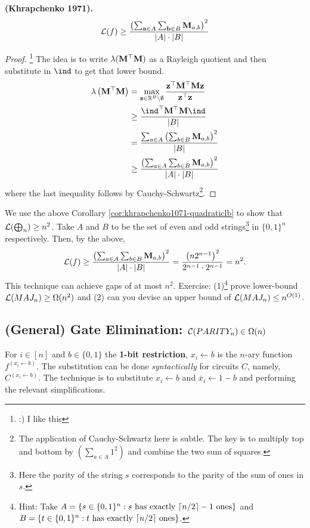 \documentclass[11pt]{article}
\begin{document}
	\begin{corollary}
		\label{cor:khrapchenko1071-quadraticlb}
		\textbf{(Khrapchenko 1971).}
		\[\mathcal{L}(f) \geq \frac{\left(\sum_{\mathbf{a} \in A}\sum_{\mathbf{b} \in B} \mathbf{M}_{a,b}\right)^2}{|A|\cdot|B|}\]
	\end{corollary}
	\begin{proof}
		\footnote{:) I like this} The idea is to write $\lambda(\mathbf{M}^{\top}\mathbf{M})$ as a Rayleigh quotient and then substitute in $\ind$ to get that lower bound.
		\begin{align*}
			\lambda\left(\mm{M}^{\top}\mm{M}\right) &= \max_{\vv{z} \in \RR^{B}\backslash \emptyset} \frac{\vv{z}^{\top}\mm{M}^{\top}\mm{M}\vv{z}}{\vv{z}^{\top}\vv{z}}\\
			&\geq \frac{\ind^{\top}\mm{M}^{\top}\mm{M}\ind}{|B|}\\
			&=\frac{\sum_{a \in A}\left(\sum_{b \in B}\mm{M}_{a,b}\right)^2}{|B|}\\
			&\geq \frac{\left(\sum_{a \in A} \sum_{b \in B} \mm{M}_{a,b}\right)^2}{|A|\cdot|B|}
		\end{align*}
		where the last inequality follows by Cauchy-Schwartz\footnote{The application of Cauchy-Schwartz here is subtle. The key is to multiply top and bottom by $\left(\sum_{a \in A} 1^2\right)$ and combine the two sum of squares.}.
	\end{proof}
	
	We use the above Corollary \ref{cor:khrapchenko1071-quadraticlb} to show that $\mathcal{L}(\operatorname{\bigoplus}_n) \geq n^2$. Take $A$ and $B$ to be the set of even and odd strings\footnote{Here the parity of the string $s$ corresponds to the parity of the sum of ones in $s$.} in $\{0,1\}^n$ respectively. Then, by the above,
	\[\mathcal{L}(f) \geq \frac{\left(\sum_{a \in A}\sum_{b \in B} \mathbf{M}_{a,b}\right)^2}{|A|\cdot|B|} = \frac{\left(n2^{n-1}\right)^2}{2^{n-1}\cdot 2^{n-1}} = n^2.\]
	This technique can achieve gaps of at most $n^2$. Exercise: (1)\footnote{Hint: Take $A = \{s \in \{0,1\}^n:s\mbox{ has exactly $\lceil n/2\rceil-1$ ones}\}$ and $B = \{t \in \{0,1\}^n:t\mbox{ has exactly $\lceil n/2\rceil$ ones}\}$.} prove lower-bound $\mathcal{L}(MAJ_n) \geq \Omega(n^2)$ and (2) can you devise an upper bound of $\mathcal{L}(MAJ_n) \leq n^{O(1)}$.
	
	\subsection{(General) Gate Elimination: \texorpdfstring{$\mathcal{C}(PARITY_n) \in \Omega(n)$}{C(PARITYn) in Omega(n)}}
	\begin{definition}
		For $i \in [n]$ and $b \in \{0,1\}$ the \textbf{1-bit restriction}, $x_i \leftarrow b$ is the $n$-ary function $f^{(x_i \leftarrow b)}$. The substitution can be done \emph{syntactically} for circuits $C$, namely, $C^{(x_i \leftarrow b)}$. The technique is to substitute $x_i \leftarrow b$ and $\overline{x}_i \leftarrow 1 - b$ and performing the relevant simplifications.
	\end{definition}
	
\end{document}
